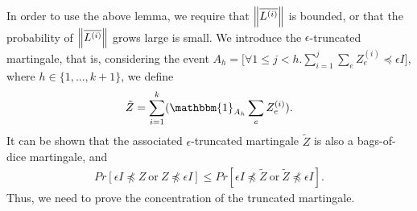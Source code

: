 \documentclass[11pt]{article}
\newcommand{\lnorm}[1]{\ensuremath{\overline{#1}}}
\begin{document}
In order to use the above lemma, we require that $\norm{\lnorm{L^{(i)}}}$ is bounded, or that the probability of $\norm{\lnorm{L^{(i)}}}$ grows large is small.
We introduce the $\epsilon$-truncated martingale, that is, considering the event
$A_h = \bigg[\forall 1 \leq j <h. \sum_{i=1}^{j} \sum_{e} Z^{(i)}_e \preceq \epsilon I\bigg]$, where $h \in \{1,\ldots, k+1 \}$,
we define 
\begin{align*}
    \tilde{Z}= \sum_{i=1}^{k} (\mathbbm{1}_{A_h} \sum_{e} Z^{(i)}_e ).
\end{align*}
It can be shown that the associated $\epsilon$-truncated martingale $\tilde{Z}$
is also a bags-of-dice martingale,
and
\begin{align*}
    Pr[ \epsilon I \npreceq Z \ \text{or}  \ Z \npreceq \epsilon I] \leq Pr[ \epsilon I \npreceq \tilde{Z} \ \text{or} \  \tilde{Z} \npreceq \epsilon I].
\end{align*}
Thus, we need to prove the concentration of the truncated martingale. 
\end{document}
